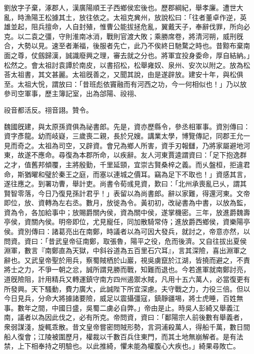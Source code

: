 
\begin{pinyinscope}
劉放字子棄，涿郡人，漢廣陽順王子西鄉侯宏後也。歷郡綱紀，舉孝廉。遭世大亂，時漁陽王松據其土，放往依之。太祖克兾州，放說松曰：「往者董卓作逆，英雄並起，阻兵擅命，人自封殖，惟曹公能拔拯危亂，翼戴天子，奉辭伐罪，所向必克。以二袁之彊，守則淮南冰消，戰則官渡大敗；乘勝席卷，將清河朔，威刑旣合，大勢以見。速至者漸福，後服者先亡，此乃不俟終日馳騖之時也。昔黥布棄南面之尊，仗劔歸漢，誠識廢興之理，審去就之分也。將軍宜投身委命，厚自結納。」松然之。會太祖討袁譚於南皮，以書招松，松舉雍奴、泉州、安次以附之。放為松荅太祖書，其文甚麗。太祖旣善之，又聞其說，由是遂辟放。建安十年，與松俱至。太祖大恱，謂放曰：「昔班彪依竇融而有河西之功，今一何相似也！」乃以放參司空軍事，歷主簿記室，出為郃陽、祋祤、

祋音都活反。祤音詡。贊令。

魏國旣建，與太原孫資俱為祕書郎。先是，資亦歷縣令，參丞相軍事。資別傳曰：資字彥龍。幼而岐嶷，三歲喪二親，長於兄嫂。講業太學，博覽傳記，同郡王允一見而奇之。太祖為司空，又辟資。會兄為鄉人所害，資手刃報讎，乃將家屬避地河東，故遂不應命。尋復為本郡所命，以疾辭。友人河東賈逵謂資曰：「足下抱逸群之才，值舊邦傾覆，主將殷勤，千里延頸，宜崇古賢桑梓之義。而乆盤桓，拒違君命，斯猶曜和璧於秦王之庭，而塞以連城之價耳。竊為足下不取也！」資感其言，遂往應之。到署功曹，舉計吏。尚書令荀彧見資，歎曰：「北州承喪亂已乆，謂其賢智零落，今日乃復見孫計君乎！」表留以為尚書郎。辭以家難，得還河東。文帝即位，放、資轉為左右丞。數月，放徙為令。黃初初，改祕書為中書，以放為監，資為令，各加給事中；放賜爵關內侯，資為關中侯，遂掌機密。三年，放進爵魏壽亭侯，資關內侯。明帝即位，尤見寵任，同加散騎常侍；進放爵西鄉侯，資樂陽亭侯。資別傳曰：諸葛亮出在南鄭，時議者以為可因大發兵，就討之，帝意亦然，以問資。資曰：「昔武皇帝征南鄭，取張魯，陽平之役，危而後濟。又自往拔出夏侯淵軍，數言『南鄭直為天獄，中斜谷道為五百里石穴耳』，言其深險，喜出淵軍之辭也。又武皇帝聖於用兵，察蜀賊栖於山巖，視吳虜竄於江湖，皆撓而避之，不責將士之力，不爭一朝之忿，誠所謂見勝而戰，知難而退也。今若進軍就南鄭討亮，道旣險阻，計用精兵又轉運鎮守南方四州遏禦水賊，凡用十五六萬人，必當復更有所發興。天下騷動，費力廣大，此誠陛下所宜深慮。夫守戰之力，力役三倍。但以今日見兵，分命大將據諸要險，威足以震攝彊寇，鎮靜疆埸，將士虎睡，百姓無事。數年之間，中國日盛，吳蜀二虜必自弊。」帝由是止。時吳人彭綺又舉義江南，議者以為因此伐之，必有所克。帝問資，資曰：「鄱陽宗人前後數有舉義者，衆弱謀淺，旋輒乖散。昔文皇帝嘗密問賊形勢，言洞浦殺萬人，得船千萬，數日間船人復會；江陵被圍歷月，權裁以千數百兵住東門，而其土地無崩解者。是有法禁，上下相奉持之明驗也。以此推綺，懼未能為權腹心大疾也。」綺果尋敗亡。


\end{pinyinscope}
